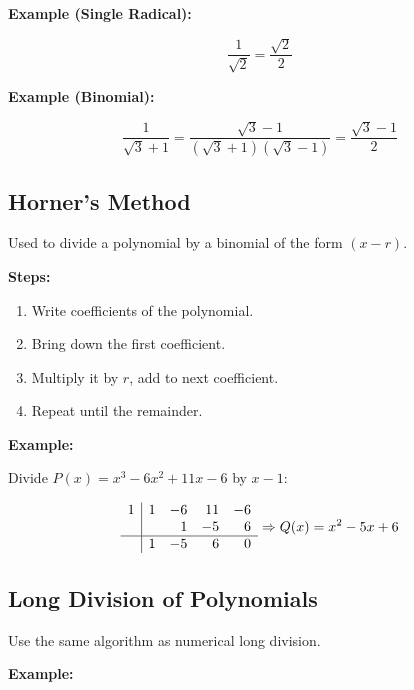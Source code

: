 \textbf{Example (Single Radical):}

\[
  \frac{1}{\sqrt{2}} = \frac{\sqrt{2}}{2}
\]

\textbf{Example (Binomial):}

\[
  \frac{1}{\sqrt{3} + 1} = \frac{\sqrt{3} - 1}{(\sqrt{3} + 1)(\sqrt{3} - 1)} = \frac{\sqrt{3} - 1}{2}
\]

\subsection{Horner’s Method}

Used to divide a polynomial by a binomial of the form \((x - r)\).

\textbf{Steps:}
\begin{enumerate}
    \item Write coefficients of the polynomial.
    \item Bring down the first coefficient.
    \item Multiply it by \(r\), add to next coefficient.
    \item Repeat until the remainder.
\end{enumerate}

\textbf{Example:}

Divide \(P(x) = x^3 - 6x^2 + 11x - 6\) by \(x - 1\):

\[
  \begin{array}{r|rrrr}
  1 & 1 & -6 & 11 & -6 \\
    &   & 1 & -5 & 6 \\
  \hline
    & 1 & -5 & 6 & 0 \\
  \end{array}
  \Rightarrow Q(x) = x^2 - 5x + 6
\]

\subsection{Long Division of Polynomials}

Use the same algorithm as numerical long division.

\textbf{Example:}

\bigskip
{}
